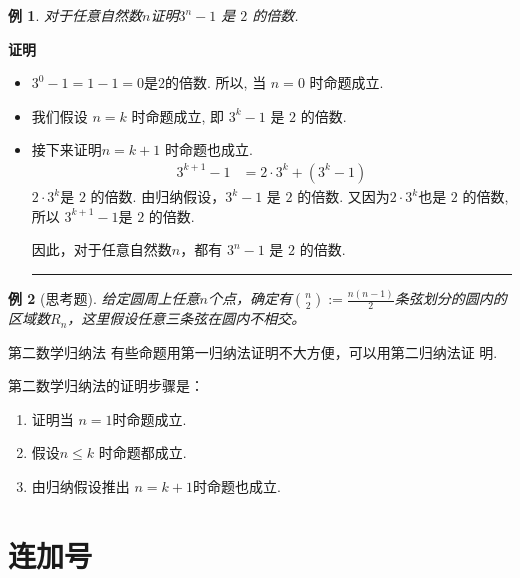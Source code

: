\documentclass[13pt,fontset=mac]{ctexbeamer}
\newtheorem{exa}{例}
\def\qed{\nopagebreak\hfill{\rule{4pt}{7pt}}\medbreak}
\def\pf{{\bf 证明~~ }}
\begin{document}
\begin{frame}
\begin{exa}
对于任意自然数$n$证明$3^n−1$ 是 $2$ 的倍数.
\end{exa}

\pause
\pf

\begin{itemize}
	\item  $3^0−1 = 1−1 = 0$是$ 2 $的倍数.  所以, 当 $n=0$ 时命题成立.
	\item 我们假设 $n=k$ 时命题成立, 即 $3^{k}−1$ 是 $2$ 的倍数.
	\item 接下来证明$n=k+1$ 时命题也成立.
	\begin{align*}
		3^{k+1}-1 & = 2 \cdot 3^{k}+(3^{k}-1 )
	\end{align*}
	$2 \cdot 3^{k}$是 $2$ 的倍数.
	由归纳假设，$3^{k}−1$ 是 $2$ 的倍数.
	又因为$2 \cdot 3^{k}$也是 $2$ 的倍数,
	所以	$3^{k+1}-1$是 $2$ 的倍数.

	因此，对于任意自然数$n$，都有 $3^n−1$ 是 $2$ 的倍数.
	 \qed
\end{itemize}
\end{frame}

\begin{frame}
	\begin{exa}[思考题]
给定圆周上任意$n$个点，确定有$\binom{n}{2}:=\frac{n(n-1)}{2}$条弦划分的圆内的区域数$R_n$，这里假设任意三条弦在圆内不相交。
	\end{exa}




\end{frame}

\begin{frame}{第二数学归纳法}
有些命题用第一归纳法证明不大方便，可以用第二归纳法证
明.

第二数学归纳法的证明步骤是：
\begin{enumerate}
\item 证明当 $n=1$时命题成立.
\item 假设$n\le k$ 时命题都成立.
\item 由归纳假设推出 $n=k+1$时命题也成立.
\end{enumerate}
\end{frame}






\section{连加号}
\end{document}
